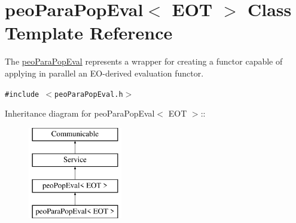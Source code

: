 \hypertarget{classpeoParaPopEval}{
\section{peo\-Para\-Pop\-Eval$<$ EOT $>$ Class Template Reference}
\label{classpeoParaPopEval}
}
The \hyperlink{classpeoParaPopEval}{peo\-Para\-Pop\-Eval} represents a wrapper for creating a functor capable of applying in parallel an EO-derived evaluation functor.  


{\tt \#include $<$peo\-Para\-Pop\-Eval.h$>$}

Inheritance diagram for peo\-Para\-Pop\-Eval$<$ EOT $>$::\begin{figure}[H]
\begin{center}
\leavevmode
\includegraphics[height=4cm]{classpeoParaPopEval}
\end{center}
\end{figure}
